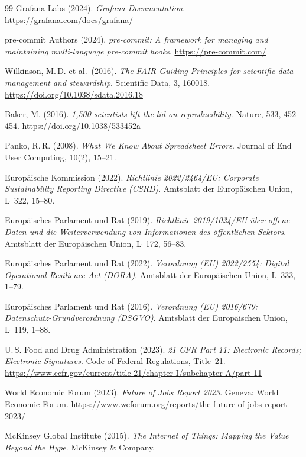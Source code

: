 \documentclass[12pt,a4paper]{report}
\theoremstyle{definition}
\theoremstyle{remark}
\begin{document}
\begin{thebibliography}{99}
  Grafana Labs (2024).
  \textit{Grafana Documentation}.
  \url{https://grafana.com/docs/grafana/}

  pre-commit Authors (2024).
  \textit{pre-commit: A framework for managing and maintaining multi-language
  pre-commit hooks}.
  \url{https://pre-commit.com/}

  Wilkinson, M.\,D. et al.\ (2016).
  \textit{The FAIR Guiding Principles for scientific data management
  and stewardship}.
  Scientific Data, 3, 160018.
  \url{https://doi.org/10.1038/sdata.2016.18}

  Baker, M. (2016).
  \textit{1,500 scientists lift the lid on reproducibility}.
  Nature, 533, 452--454.
  \url{https://doi.org/10.1038/533452a}

  Panko, R.\,R. (2008).
  \textit{What We Know About Spreadsheet Errors}.
  Journal of End User Computing, 10(2), 15--21.

  Europäische Kommission (2022).
  \textit{Richtlinie 2022/2464/EU: Corporate Sustainability Reporting
  Directive (CSRD)}.
  Amtsblatt der Europäischen Union, L~322, 15--80.

  Europäisches Parlament und Rat (2019).
  \textit{Richtlinie 2019/1024/EU über offene Daten und die
  Weiterverwendung von Informationen des öffentlichen Sektors}.
  Amtsblatt der Europäischen Union, L~172, 56--83.

  Europäisches Parlament und Rat (2022).
  \textit{Verordnung (EU) 2022/2554: Digital Operational Resilience Act
  (DORA)}.
  Amtsblatt der Europäischen Union, L~333, 1--79.

  Europäisches Parlament und Rat (2016).
  \textit{Verordnung (EU) 2016/679: Datenschutz-Grundverordnung (DSGVO)}.
  Amtsblatt der Europäischen Union, L~119, 1--88.

  U.\,S. Food and Drug Administration (2023).
  \textit{21 CFR Part 11: Electronic Records; Electronic Signatures}.
  Code of Federal Regulations, Title~21.
  \url{https://www.ecfr.gov/current/title-21/chapter-I/subchapter-A/part-11}

  World Economic Forum (2023).
  \textit{Future of Jobs Report 2023}.
  Geneva: World Economic Forum.
  \url{https://www.weforum.org/reports/the-future-of-jobs-report-2023/}

  McKinsey Global Institute (2015).
  \textit{The Internet of Things: Mapping the Value Beyond the Hype}.
  McKinsey \& Company.


\end{thebibliography}
\end{document}
